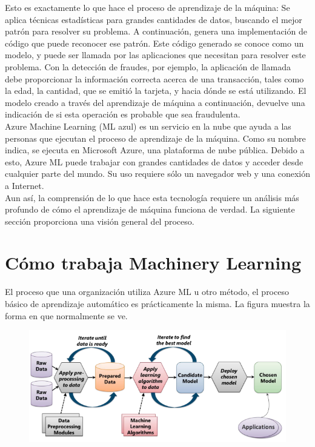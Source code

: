 \documentclass[11pt]{article}
\begin{document}
Esto es exactamente lo que hace el proceso de aprendizaje de la máquina: Se aplica técnicas estadísticas para grandes cantidades de datos, buscando el mejor patrón para resolver su problema. A continuación, genera una implementación de código que puede reconocer ese patrón. Este código generado se conoce como un modelo, y puede ser llamada por las aplicaciones que necesitan para resolver este problema. Con la detección de fraudes, por ejemplo, la aplicación de llamada debe proporcionar la información correcta acerca de una transacción, tales como la edad, la cantidad, que se emitió la tarjeta, y hacia dónde se está utilizando. El modelo creado a través del aprendizaje de máquina a continuación, devuelve una indicación de si esta operación es probable que sea fraudulenta.\\

Azure Machine Learning (ML azul) es un servicio en la nube que ayuda a las personas que ejecutan el proceso de aprendizaje de la máquina. Como su nombre indica, se ejecuta en Microsoft Azure, una plataforma de nube pública. Debido a esto, Azure ML puede trabajar con grandes cantidades de datos y acceder desde cualquier parte del mundo. Su uso requiere sólo un navegador web y una conexión a Internet.\\


Aun así, la comprensión de lo que hace esta tecnología requiere un análisis más profundo de cómo el aprendizaje de máquina funciona de verdad. La siguiente sección proporciona una visión general del proceso.\\

\newpage
\section{Cómo trabaja Machinery Learning }

El proceso que una organización utiliza Azure ML u otro método, el proceso básico de aprendizaje automático es prácticamente la misma. La figura muestra la forma en que normalmente se ve.


\begin{figure}[htp]
\centering
\includegraphics[width=13cm]{c.jpg}
\label{fig:lion}
\end{figure}
\end{document}
